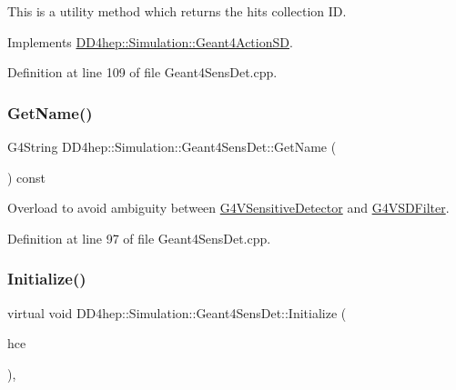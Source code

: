 This is a utility method which returns the hits collection ID. 



Implements \hyperlink{class_d_d4hep_1_1_simulation_1_1_geant4_action_s_d_ac0539610b17b20d10592201b1eb0755d}{D\+D4hep\+::\+Simulation\+::\+Geant4\+Action\+SD}.



Definition at line 109 of file Geant4\+Sens\+Det.\+cpp.

\hypertarget{class_d_d4hep_1_1_simulation_1_1_geant4_sens_det_a6ad5e5a5bf83eea0191768d090e63590}{}\label{class_d_d4hep_1_1_simulation_1_1_geant4_sens_det_a6ad5e5a5bf83eea0191768d090e63590} 
\subsubsection{\texorpdfstring{Get\+Name()}{GetName()}}
{\footnotesize\ttfamily G4\+String D\+D4hep\+::\+Simulation\+::\+Geant4\+Sens\+Det\+::\+Get\+Name (\begin{DoxyParamCaption}{ }\end{DoxyParamCaption}) const\hspace{0.3cm}{\ttfamily [inline]}}



Overload to avoid ambiguity between \hyperlink{class_g4_v_sensitive_detector}{G4\+V\+Sensitive\+Detector} and \hyperlink{class_g4_v_s_d_filter}{G4\+V\+S\+D\+Filter}. 



Definition at line 97 of file Geant4\+Sens\+Det.\+cpp.

\hypertarget{class_d_d4hep_1_1_simulation_1_1_geant4_sens_det_a64413a736de8cc5d193bf097595ae5d4}{}\label{class_d_d4hep_1_1_simulation_1_1_geant4_sens_det_a64413a736de8cc5d193bf097595ae5d4} 
\subsubsection{\texorpdfstring{Initialize()}{Initialize()}}
{\footnotesize\ttfamily virtual void D\+D4hep\+::\+Simulation\+::\+Geant4\+Sens\+Det\+::\+Initialize (\begin{DoxyParamCaption}\item[{G4\+H\+Cof\+This\+Event $\ast$}]{hce }\end{DoxyParamCaption})\hspace{0.3cm}{\ttfamily [inline]}, {\ttfamily [virtual]}}



